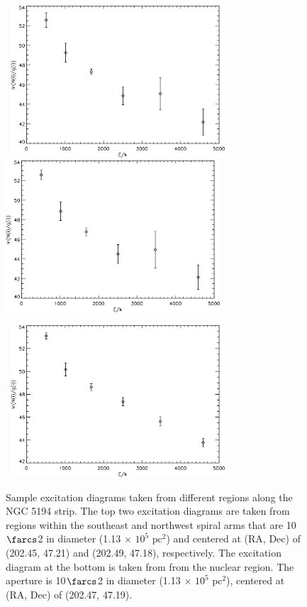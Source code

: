 \documentclass[manuscript]{aastex}
\begin{document}
\begin{figure}[!h]
\centerline{\hbox{ \hspace{0.0in} 
\includegraphics[width=8cm,angle=0]{region1.jpg}
\hspace{0.1in}
\includegraphics[width=8cm,angle=0]{region3.jpg}}}
\end{figure}

\begin{figure}[!h]
\centerline{\hbox{\hspace{0.0in}
\includegraphics[width=8cm,angle=0]{region2.jpg}}}
\caption{Sample excitation diagrams taken from different regions along the NGC 5194 strip.  The top two excitation diagrams are taken from regions within the southeast and northwest spiral arms that are 10$\farcs$2 in diameter (1.13 $\times$ $\mathrm{10^5}$ $\mathrm{pc^2}$) and centered at (RA, Dec) of (202.45, 47.21) and (202.49, 47.18), respectively. The excitation diagram at the bottom is taken from from the nuclear region.  The aperture is 10$\farcs$2 in diameter (1.13 $\times$ $\mathrm{10^5}$ $\mathrm{pc^2}$), centered at (RA, Dec) of (202.47, 47.19).
\label{fig2}}
\end{figure}
\end{document}

